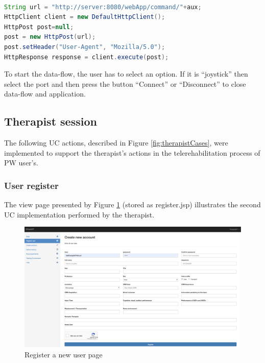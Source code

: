 \begin{lstlisting}[frame=single,language=Java]  % Start your code-block

String url = "http://server:8080/webApp/command/"+aux;
HttpClient client = new DefaultHttpClient();
HttpPost post=null;
post = new HttpPost(url);
post.setHeader("User-Agent", "Mozilla/5.0");
HttpResponse response = client.execute(post);
\end{lstlisting}


To start the data-flow, the user has to select an option. If it is ``joystick''  then select the port and then press the button ``Connect''  or ``Disconnect'' to close data-flow and application. 


\subsection{Therapist session}


The following UC actions, described in Figure \ref{fig:therapistCases}, were implemented to support the therapist's actions in the telerehabilitation process of PW user's. 

\subsubsection{User register}

The view page presented by Figure \ref{fig:tUserRegister}  (stored as register.jsp) illustrates the second UC implementation performed by the therapist. 

\begin{figure}[!hbt]
\begin{center}
\includegraphics[width=1\linewidth]{img/cap5/tUserRegister}
\caption{Register a new user page} \label{fig:tUserRegister}
\vspace{-10pt}
\end{center}
\end{figure}

